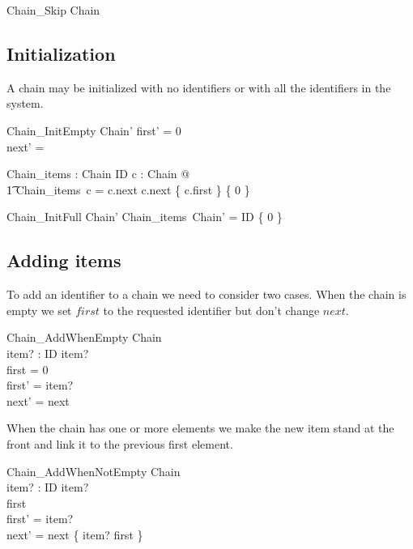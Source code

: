 \documentclass{article}
\begin{document}
\begin{schema}{Chain\_Skip}
	\Xi Chain
\end{schema}

\subsection{Initialization}

A chain may be initialized with no identifiers or with all the identifiers in the system.

\begin{schema}{Chain\_InitEmpty}
	Chain'
\where
	first' = 0 \\
	next' = \emptyset 
\end{schema}

\begin{axdef}
	Chain\_items : Chain \fun \finset ID
\where
	\forall c : Chain @ \\
\t1 		Chain\_items~c = \dom c.next \cup \ran c.next \cup \{ c.first \} \setminus \{ 0 \}
\end{axdef}

\begin{schema}{Chain\_InitFull}
	Chain'
\where
	Chain\_items~\theta Chain' = ID \setminus \{ 0 \}
\end{schema}

\subsection{Adding items}

To add an identifier to a chain we need to consider two cases. When the chain is empty we set $first$ to the requested identifier but don't change $next$. 

\begin{schema}{Chain\_AddWhenEmpty}
	\Delta Chain \\
	item? : ID
\where
	item?  \\
	first = 0 \\
	first' = item? \\
	next' = next
\end{schema}


When the chain has one or more elements we make the new item stand at the front and link it to the previous first element. 

\begin{schema}{Chain\_AddWhenNotEmpty}
	\Delta Chain \\
	item? : ID 
\where
	item?  \\
	first  \\
	first' = item? \\
	next' = next \cup  \{ item? \mapsto first \}
\end{schema}
\end{document}
